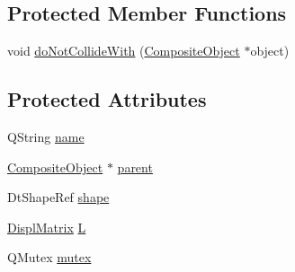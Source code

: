 \subsection*{Protected Member Functions}
\begin{DoxyCompactItemize}
\item 
void \hyperlink{class_robot_model_1_1_primitive_object_a8fc60e9e4a29b895d45871d842081605}{doNotCollideWith} (\hyperlink{class_robot_model_1_1_composite_object}{CompositeObject} $\ast$object)
\end{DoxyCompactItemize}
\subsection*{Protected Attributes}
\begin{DoxyCompactItemize}
\item 
QString \hyperlink{class_robot_model_1_1_primitive_object_ae14d0349fba88a7de488c28934bf38ce}{name}
\item 
\hyperlink{class_robot_model_1_1_composite_object}{CompositeObject} $\ast$ \hyperlink{class_robot_model_1_1_primitive_object_a70273cf8bb51ec693445e804f2c1eb34}{parent}
\item 
DtShapeRef \hyperlink{class_robot_model_1_1_primitive_object_ac0e31de5b780652446fdaa06eeec47d6}{shape}
\item 
\hyperlink{class_robot_model_1_1_displ_matrix}{DisplMatrix} \hyperlink{class_robot_model_1_1_primitive_object_a920286d17b47f5fb033de4418f4755a5}{L}
\item 
QMutex \hyperlink{class_robot_model_1_1_primitive_object_a04f683e6cd9c4acc4bd8436cd8c52e15}{mutex}
\end{DoxyCompactItemize}


